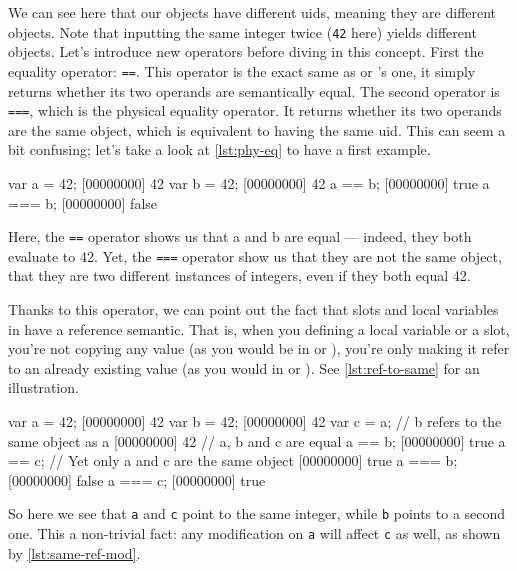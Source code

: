 We can see here that our objects have different uids, meaning they are
different objects. Note that inputting the same integer twice
(\texttt{42} here) yields different objects. Let's introduce new
operators before diving in this concept. First the equality operator:
\texttt{==}. This operator is the exact same as \C or \Cxx's one, it
simply returns whether its two operands are semantically equal. The
second operator is \texttt{===}, which is the physical equality
operator. It returns whether its two operands are the same object,
which is equivalent to having the same uid. This can seem a bit
confusing; let's take a look at \autoref{lst:phy-eq} to have a first example.

\begin{urbiscript}[caption=Physical equality operator,
label=lst:phy-eq]
var a = 42;
[00000000] 42
var b = 42;
[00000000] 42
a == b;
[00000000] true
a === b;
[00000000] false
\end{urbiscript}

Here, the \texttt{==} operator shows us that a and b are equal ---
indeed, they both evaluate to 42. Yet, the \texttt{===} operator show
us that they are not the same object, that they are two different
instances of integers, even if they both equal 42.

Thanks to this operator, we can point out the fact that slots and
local variables in \urbi have a reference semantic. That is, when you
defining a local variable or a slot, you're not copying any value (as
you would be in \C or \Cxx), you're only making it refer to an already
existing value (as you would in \ruby or \java). See \autoref{lst:ref-to-same}
for an illustration.

\begin{urbiscript}[caption=Two references to the same object,
  label=lst:ref-to-same, name=same]
var a = 42;
[00000000] 42
var b = 42;
[00000000] 42
var c = a; // b refers to the same object as a
[00000000] 42
// a, b and c are equal
a == b;
[00000000] true
a == c;
// Yet only a and c are the same object
[00000000] true
a === b;
[00000000] false
a === c;
[00000000] true
\end{urbiscript}

So here we see that \lstinline|a| and \lstinline|c| point to the same
integer, while \lstinline|b| points to a second one. This a
non-trivial fact: any modification on \lstinline|a| will affect
\lstinline|c| as well, as shown by \autoref{lst:same-ref-mod}.

